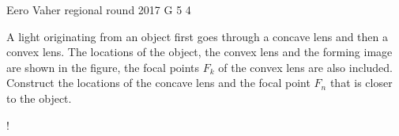 \documentclass[11pt]{article}
\begin{document}
{Eero Vaher} %
{regional round} %
{2017} %
{G 5} %
{4} %
{

\ifEngStatement
A light originating from an object first goes through a concave lens and then a convex lens. The locations of the object, the convex lens and the forming image are shown in the figure, the focal points $F_k$ of the convex lens are also included. Construct the locations of the concave lens and the focal point $F_n$ that is closer to the object.\\
\begin{resizebox}{\linewidth}{!}{
		}
\end{resizebox}
\fi
}
\end{document}
